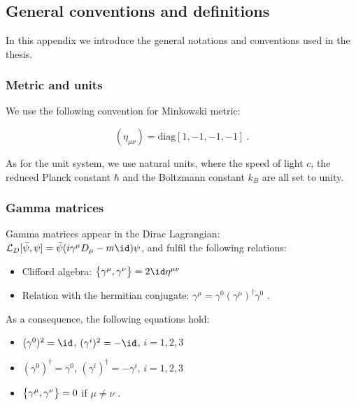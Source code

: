 \appendix

\chapter{}

\section{General conventions and definitions}

In this appendix we introduce the general notations and conventions used in the thesis. 

\subsection{Metric and units}

We use the following convention for Minkowski metric:

\begin{equation}
(\eta_{\mu\nu}) = \mathrm{diag}[1,-1,-1,-1] \: .
\label{metric}
\end{equation}

As for the unit system, we use natural units, where the speed of light $c$, the reduced Planck constant $\hbar$ and the Boltzmann constant $k_B$ are all set to unity.

\subsection{Gamma matrices}
\label{gamma_matrices}

Gamma matrices appear in the Dirac Lagrangian: $\Lag_D [\bar \psi, \psi] = \bar \psi (i \gamma^{\mu} D_{\mu} -m \id) \psi$, and fulfil the following relations:

\begin{itemize}
\item Clifford algebra: $\qty \big{\gamma^{\mu}, \gamma^{\nu}} = 2 \id \eta^{\mu \nu}$
\item Relation with the hermitian conjugate: $\gamma^{\mu} = \gamma^0 (\gamma^{\mu})^{\dagger} \gamma^0$ \: .
\end{itemize}
%
As a consequence, the following equations hold:
\begin{itemize}
\item $(\gamma^0)^2 = \id$, $(\gamma^i)^2 = - \id$, $i= 1,2,3$
\item $(\gamma^0)^{\dagger} = \gamma^0$, $(\gamma^i)^{\dagger} = -\gamma^i$, $i= 1,2,3$
\item $\qty \big{\gamma^{\mu}, \gamma^{\nu}} = 0$ if $\mu \neq \nu$ \: .
\end{itemize}

